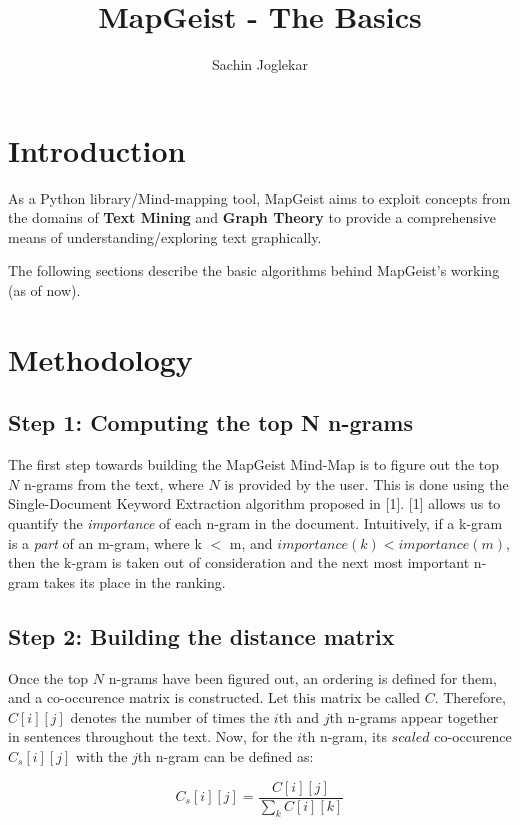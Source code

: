 \documentclass[11pt]{article}
\title{\textbf{MapGeist - The Basics}}
\author{Sachin Joglekar}
\date{}
\begin{document}
\maketitle

\section{Introduction}

As a Python library/Mind-mapping tool, MapGeist aims to exploit concepts from the domains of \textbf{Text Mining} and \textbf{Graph Theory} to provide a comprehensive means of understanding/exploring text graphically.
  
The following sections describe the basic algorithms behind MapGeist's working (as of now). 

\section{Methodology}

\subsection{Step 1: Computing the top N n-grams}

The first step towards building the MapGeist Mind-Map is to figure out the top $N$ n-grams from the text, where $N$ is provided by the user. This is done using the Single-Document Keyword Extraction algorithm proposed in [1]. [1] allows us to quantify the \textit{importance} of each n-gram in the document. Intuitively, if a k-gram is a \textit{part} of an m-gram, where k $<$ m, and $importance(k) < importance(m)$, then the k-gram is taken out of consideration and the next most important n-gram takes its place in the ranking.

\subsection{Step 2: Building the distance matrix}

Once the top $N$ n-grams have been figured out, an ordering is defined for them, and a co-occurence matrix is constructed. Let this matrix be called $C$. Therefore, $C[i][j]$ denotes the number of times the $i$th and $j$th n-grams appear together in sentences throughout the text. Now, for the $i$th n-gram, its $scaled$ co-occurence $C_s[i][j]$ with the $j$th n-gram can be defined as:

\begin{equation}
C_s[i][j] = \frac{C[i][j]}{\sum_{k} C[i][k]}
\end{equation}\\
\end{document}
